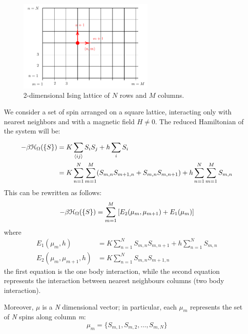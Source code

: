 \documentclass[../main/main.tex]{subfiles}
\begin{document}
\begin{figure}[h!]
\centering
\includegraphics[width=0.6\textwidth]{../lessons/9_image/4.pdf}
\caption{\label{fig:9_4} 2-dimensional Ising lattice of \(N\) rows and \(M\) columns.}
\end{figure}

We consider a set of spin arranged on a square lattice, interacting only with nearest neighbors and with a magnetic field \(H  \neq 0 \).  The reduced Hamiltonian of the system will be:
\begin{equation*}
\begin{split}
  -\beta \mathcal{H}_ \Omega  ( \{ S \}  ) &= K \sum_{\expval{ij} }^{} S_i S_j + h \sum_{i}^{} S_i  \\
  & = K \sum_{n=1}^{N} \sum_{m=1}^{M} (S_{m,n} S_{m+1,n}+S_{m,n}S_{m,n+1}) + h \sum_{n=1}^{N} \sum_{m=1}^{M} S_{m,n}
\end{split}
\end{equation*}
This can be rewritten as follows:
\begin{equation}
  -\beta \mathcal{H}_ \Omega  ( \{ S \}  ) = \sum_{m=1}^{M} \qty[E_2(\mu _m, \mu _{m+1}) + E_1(\mu _m)]
\end{equation}
where 
\begin{subequations}
\begin{align}
E_1 (\mu _m,h) &= K \sum_{n=1}^{N} S_{m,n} S_{m,n+1} + h \sum_{n=1}^{N} S_{m,n} \\
  E_2 (\mu _m, \mu _{m+1},h) & = K \sum_{n=1}^{N} S_{m,n} S_{m+1,n}
\end{align}
\end{subequations}
the first equation is the one body interaction, while the second equation represents the interaction between nearest neighbours columns (two body interaction).

Moreover, \( \mu  \)  is a \emph{N} dimensional vector; in particular, each \( \mu _m \) represents the set of \emph{N} spins along column \emph{m}:
\begin{equation}
  \mu _m = \{ S_{m,1}, S_{m,2}, \dots, S_{m,N} \}
  \label{eq:9_1}
\end{equation}
\end{document}
